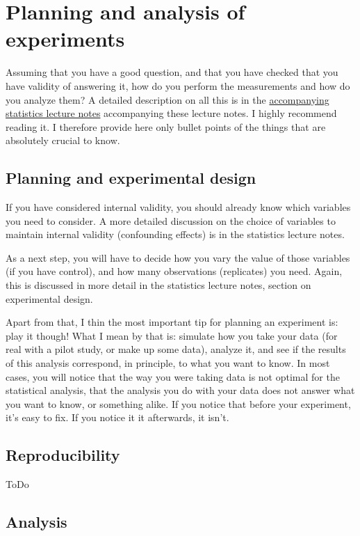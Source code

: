 \documentclass{tufte-book}
\begin{document}
\section{Planning and analysis of experiments}

Assuming that you have a good question, and that you have checked that you have validity of answering it, how do you perform the measurements and how do you analyze them? A detailed description on all this is in the \href{https://florianhartig.github.io/Statistics/}{accompanying statistics lecture notes} accompanying these lecture notes. I highly recommend reading it. I therefore provide here only bullet points of the things that are absolutely crucial to know.


\subsection{Planning and experimental design}

If you have considered internal validity, you should already know which variables you need to consider. A more detailed discussion on the choice of variables to maintain internal validity (confounding effects) is in the statistics lecture notes.

As a next step, you will have to decide how you vary the value of those variables (if you have control), and how many observations (replicates) you need. Again, this is discussed in more detail in the statistics lecture notes, section on experimental design.

Apart from that, I thin the most important tip for planning an experiment is: play it though! What I mean by that is: simulate how you take your data (for real with a pilot study, or make up some data), analyze it, and see if the results of this analysis correspond, in principle, to what you want to know. In most cases, you will notice that the way you were taking data is not optimal for the statistical analysis, that the analysis you do with your data does not answer what you want to know, or something alike. If you notice that before your experiment, it's easy to fix. If you notice it it afterwards, it isn't.


\subsection{Reproducibility}

ToDo

\subsection{Analysis}
\end{document}
